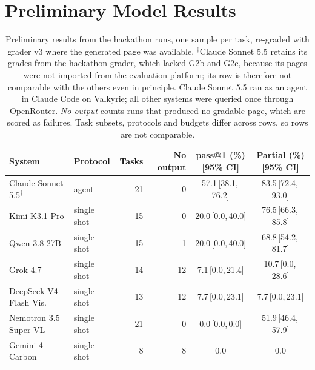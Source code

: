 \documentclass[11pt]{article}
\newcommand{\ci}[2]{\,[#1,\,#2]}
\newcommand{\chk}[1]{\textsf{#1}}
\begin{document}
\section{Preliminary Model Results}
\label{sec:models}

\begin{table}[t]
\centering
\small
\setlength{\tabcolsep}{4pt}
\begin{tabular}{llrrcc}
\toprule
System & Protocol & Tasks & No output & pass@1 (\%) [95\% CI] & Partial (\%) [95\% CI] \\
\midrule
Claude Sonnet 5.5$^\dagger$ & agent & 21 & 0 & 57.1\ci{38.1}{76.2} & 83.5\ci{72.4}{93.0} \\
Kimi K3.1 Pro & single shot & 15 & 0 & 20.0\ci{0.0}{40.0} & 76.5\ci{66.3}{85.8} \\
Qwen 3.8 27B & single shot & 15 & 1 & 20.0\ci{0.0}{40.0} & 68.8\ci{54.2}{81.7} \\
Grok 4.7 & single shot & 14 & 12 & 7.1\ci{0.0}{21.4} & 10.7\ci{0.0}{28.6} \\
DeepSeek V4 Flash Vis. & single shot & 13 & 12 & 7.7\ci{0.0}{23.1} & 7.7\ci{0.0}{23.1} \\
Nemotron 3.5 Super VL & single shot & 21 & 0 & 0.0\ci{0.0}{0.0} & 51.9\ci{46.4}{57.9} \\
Gemini 4 Carbon & single shot & 8 & 8 & 0.0 & 0.0 \\
\bottomrule
\end{tabular}
\caption{Preliminary results from the hackathon runs, one sample per task, re-graded with grader v3 where the generated page was available. $^\dagger$Claude Sonnet 5.5 retains its grades from the hackathon grader, which lacked \chk{G2b} and \chk{G2c}, because its pages were not imported from the evaluation platform; its row is therefore not comparable with the others even in principle. Claude Sonnet 5.5 ran as an agent in Claude Code on Valkyrie; all other systems were queried once through OpenRouter. \emph{No output} counts runs that produced no gradable page, which are scored as failures. Task subsets, protocols and budgets differ across rows, so rows are not comparable.}
\label{tab:models}
\end{table}
\end{document}
